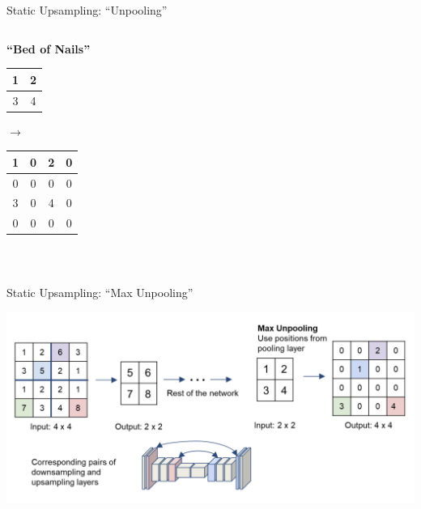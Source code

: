 \documentclass[serif, aspectratio=169]{beamer}
\begin{document}
\begin{frame}{Static Upsampling: ``Unpooling''}
\begin{columns}[c]
    \begin{column}{0.5\textwidth}
        \centering
        \textbf{``Bed of Nails''}\\
        \vspace{0.3cm}
        \begin{tabular}{|c|c|}
            \hline
            1 & 2 \\ \hline
            3 & 4 \\ \hline
        \end{tabular}
        \hspace{0.3cm} $\longrightarrow$ \hspace{0.3cm}
        \begin{tabular}{|c|c|c|c|}
            \hline
            1 & 0 & 2 & 0 \\ \hline
            0 & 0 & 0 & 0 \\ \hline
            3 & 0 & 4 & 0 \\ \hline
            0 & 0 & 0 & 0 \\ \hline
        \end{tabular}
        \vspace{0.3cm}\\
        \begin{flushleft}
        \end{flushleft}
    \end{column}
\end{columns}

\end{frame}



\begin{frame}{Static Upsampling: ``Max Unpooling''}
 
    \begin{center}
        \includegraphics[width=\textwidth]{pic/Max Unpooling.png}
    \end{center}

\end{frame}
\end{document}
